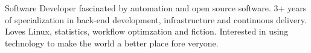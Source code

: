 

\begin{cvparagraph}

Software Developer fascinated by automation and open source software. 3+ years of specialization in back-end development, infrastructure and continuous delivery. Loves Linux, statistics, workflow optimzation and fiction. Interested in using technology to make the world a better place fore veryone.
\end{cvparagraph}

